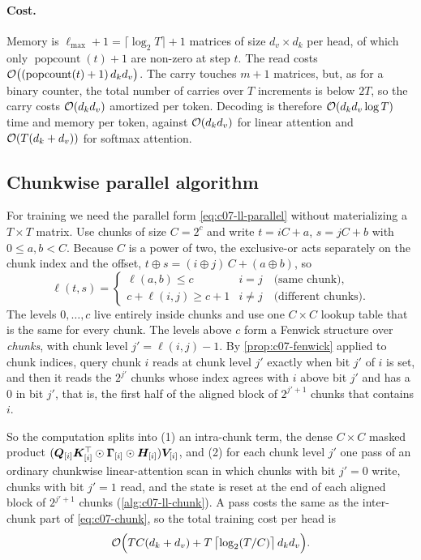 \paragraph{Cost.}
Memory is $\ell_{\max}+1 = \lceil\log_2 T\rceil + 1$ matrices of size $d_v\times d_k$ per head,
of which only $\operatorname{popcount}(t)+1$ are non-zero at step $t$. The read costs
$\mathcal{O}\bigl((\operatorname{popcount}(t)+1)\,d_kd_v\bigr)$. The carry touches $m+1$ matrices,
but, as for a binary counter, the total number of carries over $T$ increments is below $2T$,
so the carry costs $\mathcal{O}(d_kd_v)$ amortized per token. Decoding is therefore
$\mathcal{O}(d_kd_v\log T)$ time and memory per token, against $\mathcal{O}(d_kd_v)$ for linear
attention and $\mathcal{O}(T(d_k+d_v))$ for softmax attention.

\subsection{Chunkwise parallel algorithm}\label{sec:c07-ll-chunk}

For training we need the parallel form \cref{eq:c07-ll-parallel} without materializing a
$T\times T$ matrix. Use chunks of size $C = 2^c$ and write $t = iC + a$, $s = jC + b$ with
$0 \le a, b < C$. Because $C$ is a power of two, the exclusive-or acts separately on the
chunk index and the offset, $t\oplus s = (i\oplus j)\,C + (a\oplus b)$, so
\begin{equation}\label{eq:c07-ll-split}
  \ell(t,s) = \begin{cases} \ell(a,b) \le c & i = j \quad\text{(same chunk)},\\
  c + \ell(i,j) \ge c+1 & i \ne j \quad\text{(different chunks)}. \end{cases}
\end{equation}
The levels $0,\dots,c$ live entirely inside chunks and use one $C\times C$ lookup table that
is the same for every chunk. The levels above $c$ form a Fenwick structure over
\emph{chunks}, with chunk level $j' = \ell(i,j) - 1$. By \cref{prop:c07-fenwick} applied to
chunk indices, query chunk $i$ reads at chunk level $j'$ exactly when bit $j'$ of $i$ is set,
and then it reads the $2^{j'}$ chunks whose index agrees with $i$ above bit $j'$ and has a $0$
in bit $j'$, that is, the first half of the aligned block of $2^{j'+1}$ chunks that contains
$i$.

So the computation splits into (1) an intra-chunk term, the dense $C\times C$ masked product
$(\bm{Q}_{[i]}\bm{K}_{[i]}^{\top}\odot\bm{\Gamma}_{[i]}\odot\bm{H}_{[i]})\bm{V}_{[i]}$, and (2) for each chunk
level $j'$ one pass of an ordinary chunkwise linear-attention scan in which chunks with bit
$j'=0$ write, chunks with bit $j'=1$ read, and the state is reset at the end of each aligned
block of $2^{j'+1}$ chunks (\cref{alg:c07-ll-chunk}). A pass costs the same as the
inter-chunk part of \cref{eq:c07-chunk}, so the total training cost per head is
\begin{equation}\label{eq:c07-ll-cost}
  \mathcal{O}\Bigl(TC(d_k+d_v) + T\,\bigl\lceil\log_2 (T/C)\bigr\rceil\, d_kd_v\Bigr).
\end{equation}

